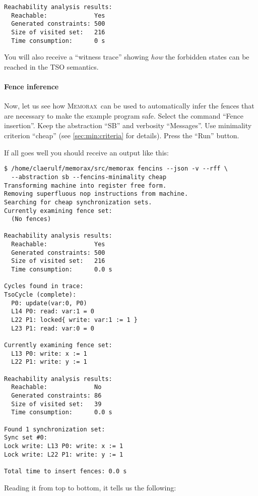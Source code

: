 \documentclass[a4paper]{article}
\newcommand{\memorax}{\textsc{Memorax}}
\begin{document}
\noindent
\begin{verbatim}
Reachability analysis results:
  Reachable:             Yes
  Generated constraints: 500
  Size of visited set:   216
  Time consumption:      0 s
\end{verbatim}

You will also receive a ``witness trace'' showing \emph{how} the
forbidden states can be reached in the TSO semantics.

\paragraph{Fence inference}
Now, let us see how \memorax\ can be used to automatically infer the
fences that are necessary to make the example program safe. Select the
command ``Fence insertion''. Keep the abstraction ``SB'' and verbosity
``Messages''. Use minimality criterion ``cheap'' (see
\cref{sec:min:criteria} for details). Press the ``Run'' button.

If all goes well you should receive an output like this:

\noindent
\begin{verbatim}
$ /home/claerulf/memorax/src/memorax fencins --json -v --rff \
  --abstraction sb --fencins-minimality cheap
Transforming machine into register free form.
Removing superfluous nop instructions from machine.
Searching for cheap synchronization sets.
Currently examining fence set:
  (No fences)

Reachability analysis results:
  Reachable:             Yes
  Generated constraints: 500
  Size of visited set:   216
  Time consumption:      0.0 s

Cycles found in trace:
TsoCycle (complete):
  P0: update(var:0, P0)
  L14 P0: read: var:1 = 0
  L22 P1: locked{ write: var:1 := 1 }
  L23 P1: read: var:0 = 0

Currently examining fence set:
  L13 P0: write: x := 1
  L22 P1: write: y := 1

Reachability analysis results:
  Reachable:             No
  Generated constraints: 86
  Size of visited set:   39
  Time consumption:      0.0 s

Found 1 synchronization set:
Sync set #0:
Lock write: L13 P0: write: x := 1
Lock write: L22 P1: write: y := 1

Total time to insert fences: 0.0 s
\end{verbatim}

Reading it from top to bottom, it tells us the following:
\end{document}
